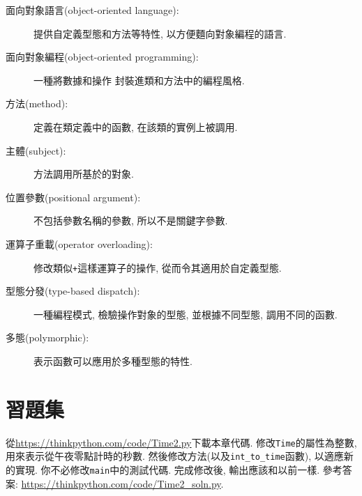 \documentclass[10pt]{book}
\begin{document}
\begin{description}

\item[面向對象語言(object-oriented language):] 提供自定義型態和方法等特性, 
以方便麵向對象編程的語言. 

\item[面向對象編程(object-oriented programming):] 
一種將數據和操作
封裝進類和方法中的編程風格.

\item[方法(method):] 定義在類定義中的函數, 
在該類的實例上被調用. 

\item[主體(subject):] 方法調用所基於的對象. 

\item[位置參數(positional argument):] 不包括參數名稱的參數, 
所以不是關鍵字參數. 

\item[運算子重載(operator overloading):] 修改類似{\tt +}這樣運算子的操作, 
從而令其適用於自定義型態. 

\item[型態分發(type-based dispatch):] 一種編程模式, 檢驗操作對象的型態, 
並根據不同型態, 調用不同的函數. 

\item[多態(polymorphic):] 表示函數可以應用於多種型態的特性. 

\end{description}


\section{習題集}

\begin{exercise}

從\url{https://thinkpython.com/code/Time2.py}下載本章代碼. 
修改{\tt Time}的屬性為整數, 用來表示從午夜零點計時的秒數. 
然後修改方法(以及\verb"int_to_time"函數), 以適應新的實現. 
你不必修改{\tt main}中的測試代碼. 
完成修改後, 輸出應該和以前一樣. 
參考答案: \url{https://thinkpython.com/code/Time2_soln.py}.

\end{exercise}
\end{document}
